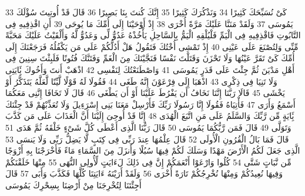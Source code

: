\documentclass[20pt,a4paper]{article}
\begin{document}
{\tiny\colorbox{cl_aya}{33}} كَىْ نُسَبِّحَكَ كَثِيرًا
{\tiny\colorbox{cl_aya}{34}} وَنَذْكُرَكَ كَثِيرًا
{\tiny\colorbox{cl_aya}{35}} إِنَّكَ كُنتَ بِنَا بَصِيرًا
{\tiny\colorbox{cl_aya}{36}} قَالَ قَدْ أُوتِيتَ سُؤْلَكَ يَمُوسَى
{\tiny\colorbox{cl_aya}{37}} وَلَقَدْ مَنَنَّا عَلَيْكَ مَرَّةً أُخْرَى
{\tiny\colorbox{cl_aya}{38}} إِذْ أَوْحَيْنَا إِلَى أُمِّكَ مَا يُوحَى
{\tiny\colorbox{cl_aya}{39}} أَنِ اقْذِفِيهِ فِى التَّابُوتِ فَاقْذِفِيهِ فِى الْيَمِّ فَلْيُلْقِهِ الْيَمُّ بِالسَّاحِلِ يَأْخُذْهُ عَدُوٌّ لِّى وَعَدُوٌّ لَّهُ وَأَلْقَيْتُ عَلَيْكَ مَحَبَّةً مِّنِّى وَلِتُصْنَعَ عَلَى عَيْنِى
{\tiny\colorbox{cl_aya}{40}} إِذْ تَمْشِى أُخْتُكَ فَتَقُولُ هَلْ أَدُلُّكُمْ عَلَى مَن يَكْفُلُهُ فَرَجَعْنَكَ إِلَى أُمِّكَ كَىْ تَقَرَّ عَيْنُهَا وَلَا تَحْزَنَ وَقَتَلْتَ نَفْسًا فَنَجَّيْنَكَ مِنَ الْغَمِّ وَفَتَنَّكَ فُتُونًا فَلَبِثْتَ سِنِينَ فِى أَهْلِ مَدْيَنَ ثُمَّ جِئْتَ عَلَى قَدَرٍ يَمُوسَى
{\tiny\colorbox{cl_aya}{41}} وَاصْطَنَعْتُكَ لِنَفْسِى
{\tiny\colorbox{cl_aya}{42}} اذْهَبْ أَنتَ وَأَخُوكَ بَِٔايَتِى وَلَا تَنِيَا فِى ذِكْرِى
{\tiny\colorbox{cl_aya}{43}} اذْهَبَا إِلَى فِرْعَوْنَ إِنَّهُ طَغَى
{\tiny\colorbox{cl_aya}{44}} فَقُولَا لَهُ قَوْلًا لَّيِّنًا لَّعَلَّهُ يَتَذَكَّرُ أَوْ يَخْشَى
{\tiny\colorbox{cl_aya}{45}} قَالَا رَبَّنَا إِنَّنَا نَخَافُ أَن يَفْرُطَ عَلَيْنَا أَوْ أَن يَطْغَى
{\tiny\colorbox{cl_aya}{46}} قَالَ لَا تَخَافَا إِنَّنِى مَعَكُمَا أَسْمَعُ وَأَرَى
{\tiny\colorbox{cl_aya}{47}} فَأْتِيَاهُ فَقُولَا إِنَّا رَسُولَا رَبِّكَ فَأَرْسِلْ مَعَنَا بَنِى إِسْرَءِيلَ وَلَا تُعَذِّبْهُمْ قَدْ جِئْنَكَ بَِٔايَةٍ مِّن رَّبِّكَ وَالسَّلَمُ عَلَى مَنِ اتَّبَعَ الْهُدَى
{\tiny\colorbox{cl_aya}{48}} إِنَّا قَدْ أُوحِىَ إِلَيْنَا أَنَّ الْعَذَابَ عَلَى مَن كَذَّبَ وَتَوَلَّى
{\tiny\colorbox{cl_aya}{49}} قَالَ فَمَن رَّبُّكُمَا يَمُوسَى
{\tiny\colorbox{cl_aya}{50}} قَالَ رَبُّنَا الَّذِى أَعْطَى كُلَّ شَىْءٍ خَلْقَهُ ثُمَّ هَدَى
{\tiny\colorbox{cl_aya}{51}} قَالَ فَمَا بَالُ الْقُرُونِ الْأُولَى
{\tiny\colorbox{cl_aya}{52}} قَالَ عِلْمُهَا عِندَ رَبِّى فِى كِتَبٍ لَّا يَضِلُّ رَبِّى وَلَا يَنسَى
{\tiny\colorbox{cl_aya}{53}} الَّذِى جَعَلَ لَكُمُ الْأَرْضَ مَهْدًا وَسَلَكَ لَكُمْ فِيهَا سُبُلًا وَأَنزَلَ مِنَ السَّمَاءِ مَاءً فَأَخْرَجْنَا بِهِ أَزْوَجًا مِّن نَّبَاتٍ شَتَّى
{\tiny\colorbox{cl_aya}{54}} كُلُوا وَارْعَوْا أَنْعَمَكُمْ إِنَّ فِى ذَلِكَ لَءَايَتٍ لِّأُولِى النُّهَى
{\tiny\colorbox{cl_aya}{55}} مِنْهَا خَلَقْنَكُمْ وَفِيهَا نُعِيدُكُمْ وَمِنْهَا نُخْرِجُكُمْ تَارَةً أُخْرَى
{\tiny\colorbox{cl_aya}{56}} وَلَقَدْ أَرَيْنَهُ ءَايَتِنَا كُلَّهَا فَكَذَّبَ وَأَبَى
{\tiny\colorbox{cl_aya}{57}} قَالَ أَجِئْتَنَا لِتُخْرِجَنَا مِنْ أَرْضِنَا بِسِحْرِكَ يَمُوسَى
\end{document}
